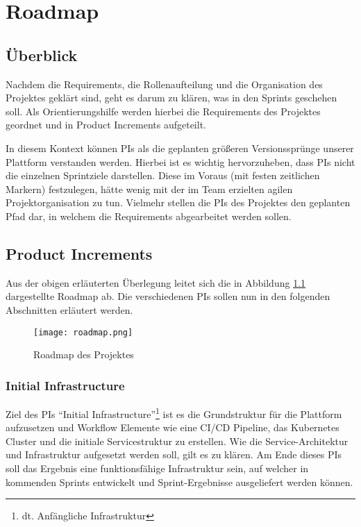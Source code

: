 
\chapter{Roadmap}

\section{Überblick}
Nachdem die Requirements, die Rollenaufteilung und die Organisation des Projektes geklärt sind, geht es darum zu klären, was in den Sprints geschehen soll.
Als Orientierungshilfe werden hierbei die Requirements des Projektes geordnet und in Product Increments aufgeteilt.

In diesem Kontext können \acp{PI} als die geplanten größeren Versionssprünge unserer Plattform verstanden werden.
Hierbei ist es wichtig hervorzuheben, dass \acp{PI} nicht die einzelnen Sprintziele darstellen.
Diese im Voraus (mit festen zeitlichen Markern) festzulegen, hätte wenig mit der im Team erzielten agilen Projektorganisation zu tun.
Vielmehr stellen die \acp{PI} des Projektes den geplanten Pfad dar, in welchem die Requirements abgearbeitet werden sollen.

\section{Product Increments}
Aus der obigen erläuterten Überlegung leitet sich die in Abbildung \ref{fig:roadmap} dargestellte Roadmap ab.
Die verschiedenen \acp{PI} sollen nun in den folgenden Abschnitten erläutert werden.

\begin{figure}
    \centering
    \texttt{[image: roadmap.png]}
    \caption{Roadmap des Projektes}
    \label{fig:roadmap}
\end{figure}

\subsection{Initial Infrastructure} \label{initial_infra}
Ziel des \acp{PI} \enquote{Initial Infrastructure}\footnote{dt. Anfängliche Infrastruktur} ist es die Grundstruktur für die Plattform aufzusetzen und Workflow Elemente wie eine \ac{CI/CD} Pipeline, das Kubernetes Cluster und die initiale Servicestruktur zu erstellen.
Wie die Service-Architektur und Infrastruktur aufgesetzt werden soll, gilt es zu klären.
Am Ende dieses \acp{PI} soll das Ergebnis eine funktionsfähige Infrastruktur sein, auf welcher in kommenden Sprints entwickelt und Sprint-Ergebnisse ausgeliefert werden können.

